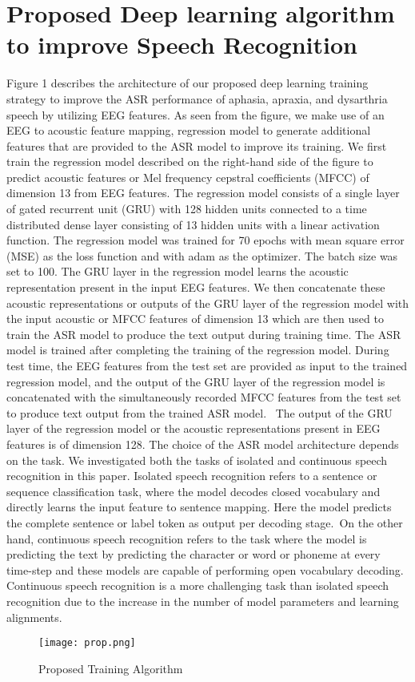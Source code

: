 \documentclass[letterpaper, 10 pt, conference]{ieeeconf}  %
\begin{document}
\section{Proposed Deep learning algorithm to improve Speech Recognition}
Figure 1 describes the architecture of our proposed deep learning training strategy to improve the ASR performance of aphasia, apraxia, and dysarthria speech by utilizing EEG features. As seen from the figure, we make use of an EEG to acoustic feature mapping, regression model to generate additional features that are provided to the ASR model to improve its training. We first train the regression model described on the right-hand side of the figure to predict acoustic features or Mel frequency cepstral coefficients (MFCC) \cite{vergin1999generalized} of dimension 13 from EEG features. The regression model consists of a single layer of gated recurrent unit (GRU) \cite{chung2014empirical} with 128 hidden units connected to a time distributed dense layer consisting of 13 hidden units with a linear activation function. The regression model was trained for 70 epochs with mean square error (MSE) as the loss function and with adam \cite{kingma2014adam} as the optimizer. The batch size was set to 100. The GRU layer in the regression model learns the acoustic representation present in the input EEG features. We then concatenate these acoustic representations or outputs of the GRU layer of the regression model with the input acoustic or MFCC features of dimension 13 which are then used to train the ASR model to produce the text output during training time. The ASR model is trained after completing the training of the regression model. During test time, the EEG features from the test set are provided as input to the trained regression model, and the output of the GRU layer of the regression model is concatenated with the simultaneously recorded MFCC features from the test set to produce text output from the trained ASR model.  The output of the GRU layer of the regression model or the acoustic representations present in EEG features is of dimension 128. The choice of the ASR model architecture depends on the task. We investigated both the tasks of isolated and continuous speech recognition in this paper. Isolated speech recognition refers to a sentence or sequence classification task, where the model decodes closed vocabulary and directly learns the input feature to sentence mapping. Here the model predicts the complete sentence or label token as output per decoding stage. On the other hand, continuous speech recognition refers to the task where the model is predicting the text by predicting the character or word or phoneme at every time-step and these models are capable of performing open vocabulary decoding. Continuous speech recognition is a more challenging task than isolated speech recognition due to the increase in the number of model parameters and learning alignments. 
\begin{figure}[h]
\begin{center}
\texttt{[image: prop.png]}
\caption{Proposed Training Algorithm} 
\label{1vsall}
\end{center}
\end{figure}
\end{document}
